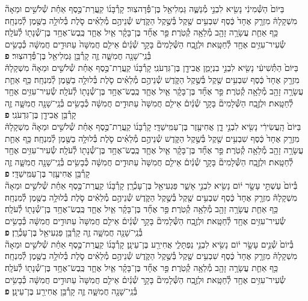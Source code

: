 \documentclass[twoside, openany, parskip=half, 11pt]{book}
\begin{document}
\begin{footnotesize}
\begin{multicols}{2}
בַּיּוֹם֙ הַשְּׁ֯מִינִ֔י נָשִׂ֖יא לִבְנֵ֣י מְ֯נַשֶּׁ֑ה גַּמְלִיאֵ֖ל בֶּן־פְּ֯דָהצֽוּר׃ קָרְ֯בָּנ֜וֹ קַֽעֲרַת־כֶּ֣סֶף אַחַ֗ת שְׁ֯לֹשִׁ֣ים וּמֵאָה֘ מִשְׁקָלָהּ֒ מִזְרָ֤ק אֶחָד֙ כֶּ֔סֶף שִׁבְעִ֥ים שֶׁ֖קֶל בְּ֯שֶׁ֣קֶל הַקֹּ֑דֶשׁ שְׁ֯נֵיהֶ֣ם מְ֯לֵאִ֗ים סֹ֛לֶת בְּ֯לוּלָ֥ה בַשֶּׁ֖מֶן לְ֯מִנְחָֽה׃ כַּ֥ף אַחַ֛ת עֲשָׂרָ֥ה זָהָ֖ב מְ֯לֵאָ֥ה קְ֯טֹֽרֶת׃  פַּ֣ר אֶחָ֞ד בֶּן־בָּקָ֗ר אַ֧יִל אֶחָ֛ד כֶּֽבֶשׂ־אֶחָ֥ד בֶּן־שְׁ֯נָת֖וֹ לְ֯עֹלָֽה׃ שְׂ֯עִיר־עִזִּ֥ים אֶחָ֖ד לְ֯חַטָּֽאת׃ וּלְזֶ֣בַֽח הַשְּׁ֯לָמִים֘ בָּקָ֣ר שְׁ֯נַ֒יִם֒ אֵילִ֤ם חֲמִשָּׁה֙ עַתּוּדִ֣ים חֲמִשָּׁ֔ה כְּ֯בָשִׂ֥ים בְּ֯נֵֽי־שָׁנָ֖ה חֲמִשָּׁ֑ה זֶ֛ה קָרְ֯בַּ֥ן גַּמְלִיאֵ֖ל בֶּן־פְּ֯דָהצֽוּר׃ \textbf{פ} \\
 בַּיּוֹם֙ הַתְּ֯שִׁיעִ֔י נָשִׂ֖יא לִבְנֵ֣י בִנְיָמִ֑ן אֲבִידָ֖ן בֶּן־גִּדְעֹנִֽי׃ קָרְ֯בָּנ֜וֹ קַֽעֲרַת־כֶּ֣סֶף אַחַ֗ת שְׁ֯לֹשִׁ֣ים וּמֵאָה֘ מִשְׁקָלָהּ֒ מִזְרָ֤ק אֶחָד֙ כֶּ֔סֶף שִׁבְעִ֥ים שֶׁ֖קֶל בְּ֯שֶׁ֣קֶל הַקֹּ֑דֶשׁ שְׁ֯נֵיהֶ֣ם מְ֯לֵאִ֗ים סֹ֛לֶת בְּ֯לוּלָ֥ה בַשֶּׁ֖מֶן לְ֯מִנְחָֽה׃ כַּ֥ף אַחַ֛ת עֲשָׂרָ֥ה זָהָ֖ב מְ֯לֵאָ֥ה קְ֯טֹֽרֶת׃ פַּ֣ר אֶחָ֞ד בֶּן־בָּקָ֗ר אַ֧יִל אֶחָ֛ד כֶּֽבֶשׂ־אֶחָ֥ד בֶּן־שְׁ֯נָת֖וֹ לְ֯עֹלָֽה׃ שְׂ֯עִיר־עִזִּ֥ים אֶחָ֖ד לְ֯חַטָּֽאת׃ וּלְזֶ֣בַֽח הַשְּׁ֯לָמִים֘ בָּקָ֣ר שְׁ֯נַ֒יִם֒ אֵילִ֤ם חֲמִשָּׁה֙ עַתּוּדִ֣ים חֲמִשָּׁ֔ה כְּ֯בָשִׂ֥ים בְּ֯נֵֽי־שָׁנָ֖ה חֲמִשָּׁ֑ה זֶ֛ה קָרְ֯בַּ֥ן אֲבִידָ֖ן בֶּן־גִּדְעֹנִֽי׃ \textbf{פ} \\
בַּיּוֹם֙ הָֽעֲשִׂירִ֔י נָשִׂ֖יא לִבְנֵ֣י דָ֑ן אֲחִיעֶ֖זֶר בֶּן־עַמִּֽישַׁדָּֽי׃ קָרְ֯בָּנ֜וֹ קַֽעֲרַת־כֶּ֣סֶף אַחַ֗ת שְׁ֯לֹשִׁ֣ים וּמֵאָה֘ מִשְׁקָלָהּ֒ מִזְרָ֤ק אֶחָד֙ כֶּ֔סֶף שִׁבְעִ֥ים שֶׁ֖קֶל בְּ֯שֶׁ֣קֶל הַקֹּ֑דֶשׁ שְׁ֯נֵיהֶ֣ם מְ֯לֵאִ֗ים סֹ֛לֶת בְּ֯לוּלָ֥ה בַשֶּׁ֖מֶן לְ֯מִנְחָֽה׃ כַּ֥ף אַחַ֛ת עֲשָׂרָ֥ה זָהָ֖ב מְ֯לֵאָ֥ה קְ֯טֹֽרֶת׃ פַּ֣ר אֶחָ֞ד בֶּן־בָּקָ֗ר אַ֧יִל אֶחָ֛ד כֶּֽבֶשׂ־אֶחָ֥ד בֶּן־שְׁ֯נָת֖וֹ לְ֯עֹלָֽה׃ שְׂ֯עִיר־עִזִּ֥ים אֶחָ֖ד לְ֯חַטָּֽאת׃ וּלְזֶ֣בַֽח הַשְּׁ֯לָמִים֘ בָּקָ֣ר שְׁ֯נַ֒יִם֒ אֵילִ֤ם חֲמִשָּׁה֙ עַתּוּדִ֣ים חֲמִשָּׁ֔ה כְּ֯בָשִׂ֥ים בְּ֯נֵֽי־שָׁנָ֖ה חֲמִשָּׁ֑ה זֶ֛ה קָרְ֯בַּ֥ן אֲחִיעֶ֖זֶר בֶּן־עַמִּֽישַׁדָּֽי׃ \textbf{פ} \\
בְּ֯יוֹם֙ עַשְׁתֵּ֣י עָשָׂ֣ר י֔וֹם נָשִׂ֖יא לִבְנֵ֣י אָשֵׁ֑ר פַּגְעִיאֵ֖ל בֶּן־עָכְ֯רָֽן׃ קָרְ֯בָּנ֜וֹ קַֽעֲרַת־כֶּ֣סֶף אַחַ֗ת שְׁ֯לֹשִׁ֣ים וּמֵאָה֘ מִשְׁקָלָהּ֒ מִזְרָ֤ק אֶחָד֙ כֶּ֔סֶף שִׁבְעִ֥ים שֶׁ֖קֶל בְּ֯שֶׁ֣קֶל הַקֹּ֑דֶשׁ שְׁ֯נֵיהֶ֣ם מְ֯לֵאִ֗ים סֹ֛לֶת בְּ֯לוּלָ֥ה בַשֶּׁ֖מֶן לְ֯מִנְחָֽה׃ כַּ֥ף אַחַ֛ת עֲשָׂרָ֥ה זָהָ֖ב מְ֯לֵאָ֥ה קְ֯טֹֽרֶת׃ פַּ֣ר אֶחָ֞ד בֶּן־בָּקָ֗ר אַ֧יִל אֶחָ֛ד כֶּֽבֶשׂ־אֶחָ֥ד בֶּן־שְׁ֯נָת֖וֹ לְ֯עֹלָֽה׃ שְׂ֯עִיר־עִזִּ֥ים אֶחָ֖ד לְ֯חַטָּֽאת׃ וּלְזֶ֣בַֽח הַשְּׁ֯לָמִים֘ בָּקָ֣ר שְׁ֯נַ֒יִם֒ אֵילִ֤ם חֲמִשָּׁה֙ עַתּוּדִ֣ים חֲמִשָּׁ֔ה כְּ֯בָשִׂ֥ים בְּ֯נֵֽי־שָׁנָ֖ה חֲמִשָּׁ֑ה זֶ֛ה קָרְ֯בַּ֥ן פַּגְעִיאֵ֖ל בֶּן־עָכְ֯רָֽן׃ \textbf{פ} \\
בְּ֯יוֹם֙ שְׁ֯נֵ֣ים עָשָׂ֣ר י֔וֹם נָשִׂ֖יא לִבְנֵ֣י נַפְתָּלִ֑י אֲחִירַ֖ע בֶּן־עֵינָֽן׃ קָרְ֯בָּנ֜וֹ קַֽעֲרַת־כֶּ֣סֶף אַחַ֗ת שְׁ֯לֹשִׁ֣ים וּמֵאָה֘ מִשְׁקָלָהּ֒ מִזְרָ֤ק אֶחָד֙ כֶּ֔סֶף שִׁבְעִ֥ים שֶׁ֖קֶל בְּ֯שֶׁ֣קֶל הַקֹּ֑דֶשׁ שְׁ֯נֵיהֶ֣ם מְ֯לֵאִ֗ים סֹ֛לֶת בְּ֯לוּלָ֥ה בַשֶּׁ֖מֶן לְ֯מִנְחָֽה׃ כַּ֥ף אַחַ֛ת עֲשָׂרָ֥ה זָהָ֖ב מְ֯לֵאָ֥ה קְ֯טֹֽרֶת׃ פַּ֣ר אֶחָ֞ד בֶּן־בָּקָ֗ר אַ֧יִל אֶחָ֛ד כֶּֽבֶשׂ־אֶחָ֥ד בֶּן־שְׁ֯נָת֖וֹ לְ֯עֹלָֽה׃ שְׂ֯עִיר־עִזִּ֥ים אֶחָ֖ד לְ֯חַטָּֽאת׃ וּלְזֶ֣בַֽח הַשְּׁ֯לָמִים֘ בָּקָ֣ר שְׁ֯נַ֒יִם֒ אֵילִ֤ם חֲמִשָּׁה֙ עַתּוּדִ֣ים חֲמִשָּׁ֔ה כְּ֯בָשִׂ֥ים בְּ֯נֵֽי־שָׁנָ֖ה חֲמִשָּׁ֑ה זֶ֛ה קָרְ֯בַּ֥ן אֲחִירַ֖ע בֶּן־עֵינָֽן׃ \textbf{פ} \\

\end{multicols}
\end{footnotesize}
\end{document}
